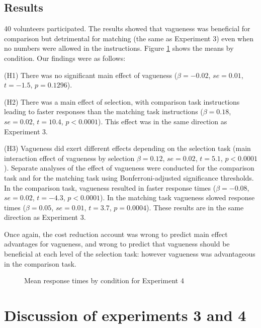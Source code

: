 \documentclass[%
man,		%
floatsintext,%
apacite%
]{apa6}
\begin{document}
\subsection{Results}%
40 volunteers participated.
The results showed that vagueness was beneficial for comparison but detrimental for matching (the same as Experiment 3) even when no numbers were allowed in the instructions. 
Figure \ref{resultse4} shows the means by condition. Our findings were as follows:

{\small
\begin{APAenumerate}
	\item [(H1)] There was no significant main effect of vagueness ($\beta=-0.02$, $se=0.01$, $t=-1.5$, $p=0.1296$). 
	\item [(H2)] There was a main effect of selection, with comparison task instructions leading to faster responses than the matching task instructions ($\beta=0.18$, $se=0.02$, $t=10.4$, $p<0.0001$).  This effect was in the same direction as Experiment 3. 
	\item[(H3)] Vagueness did exert different effects depending on the selection task (main interaction effect of vagueness by selection $\beta=0.12$, $se=0.02$, $t=5.1$, $p<0.0001$). 
Separate analyses of the effect of vagueness were conducted for the comparison task and for the matching task using Bonferroni-adjusted significance thresholds. 
In the comparison task, vagueness resulted in faster response times ($\beta=-0.08$, $se=0.02$, $t=-4.3$, $p<0.0001$). 
In the matching task vagueness slowed response times ($\beta=0.05$, $se=0.01$, $t=3.7$, $p=0.0004$). 
These results are in the same direction as Experiment 3.
\end{APAenumerate}
}

Once again, the cost reduction account was wrong to predict main effect advantages for vagueness, and wrong to predict that vagueness should be beneficial at each level of the selection task: however vagueness was advantageous in the comparison task.

\begin{figure}[htbp]
\centering
{}
\caption{Mean response times by condition for Experiment 4}
\label{resultse4}
\end{figure}

\section{Discussion of experiments 3 and 4}
\end{document}
